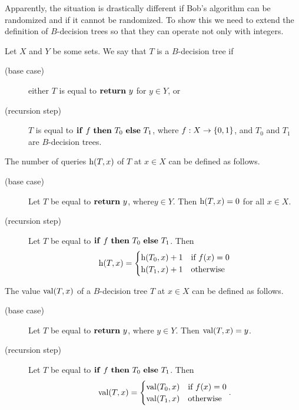Apparently, the situation is drastically different if Bob's algorithm can be
randomized and if it cannot be randomized. To show this we need to extend the
definition of $B$-decision trees so that they can operate not only with
integers.
\begin{definition}
  Let $X$ and $Y$ be some sets. We say that $T$ is a $B$-decision tree if
  \begin{description}
    \item [(base case)] either $T$ is equal to $\mathbf{return}~{y}$ for $y \in Y$, or
    \item [(recursion step)] $T$ is equal to $\mathbf{if}~{f}~\mathbf{then}~{T_0}~\mathbf{else}~{T_1}$,
      where $f : X \to \set{0, 1}$, and $T_0$ and $T_1$
      are $B$-decision trees.
  \end{description}

  The number of queries $\DTHeight[x]{T}$ of $T$ at $x \in X$ can be defined as
  follows.
  \begin{description}
    \item [(base case)] Let $T$ be equal to $\mathbf{return}~{y}$, where$y \in Y$. Then
      $\DTHeight[x]{T} = 0$ for all $x \in X$.
    \item[(recursion step)] Let $T$ be equal to $\mathbf{if}~{f}~\mathbf{then}~{T_0}~\mathbf{else}~{T_1}$. Then
      \[
          \DTHeight[x]{T} = 
          \begin{cases}
            \DTHeight[x]{T_0} + 1 & \text{if } f(x) = 0 \\
            \DTHeight[x]{T_1} + 1 & \text{otherwise}
          \end{cases}
      \]
  \end{description}

  The value $\mathrm{val}({T}, {x})$ of a $B$-decision tree $T$ at $x \in X$
  can be defined as follows.
  \begin{description}
      \item [(base case)] Let $T$ be equal to $\mathbf{return}~{y}$, where $y \in Y$.
        Then $\mathrm{val}({T}, {x}) = y$.
      \item[(recursion step)] Let $T$ be equal to $\mathbf{if}~{f}~\mathbf{then}~{T_0}~\mathbf{else}~{T_1}$. Then
        \[
          \mathrm{val}({T}, {x}) =
          \begin{cases} 
            \mathrm{val}({T_0}, {x}) & \text{if } f(x) = 0 \\
            \mathrm{val}({T_1}, {x}) & \text{otherwise}
          \end{cases}.
        \]
  \end{description}
\end{definition}

